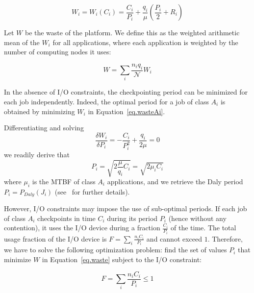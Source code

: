 \documentclass[two]{article}
\newcommand{\nbnodesplat}{{\mathcal N}}
\newcommand{\app}[1]{A_{#1}}
\newcommand{\nbapp}[1]{n_{#1}}
\newcommand{\nbnodes}[1]{q_{#1}}
\newcommand{\period}[1]{P_{#1}}
\newcommand{\ckpt}[1]{C_{#1}}
\newcommand{\reco}[1]{R_{#1}}
\newcommand{\wasteapp}[1]{W_{#1}}
\newcommand{\mtbfplat}{\mu}
\newcommand{\wasteplat}{W}
\newcommand{\ioconstraint}{F}
\newcommand{\wastefct}[2]{W_{#1}(#2)}
\begin{document}
\begin{equation}
\wasteapp{i} = \wastefct{i}{\ckpt{i}} = \frac{\ckpt{i}}{\period{i}} +
\frac{\nbnodes{i}}{\mtbfplat}(\frac{\period{i}}{2} + \reco{i})
\label{eq.wasteAi}
\end{equation}

Let $\wasteplat$ be the waste of the platform. We define this as the
weighted arithmetic mean of the $\wasteapp{i}$ for all applications,
where each application is weighted by the number of computing nodes
it uses:

\begin{equation}
\wasteplat = \sum_i \frac{\nbapp{i} \nbnodes{i}}{\nbnodesplat} \wasteapp{i}
\label{eq.waste}
\end{equation}

In the absence of I/O constraints, the checkpointing period can be minimized
for each job independently. Indeed, the optimal period for a job
of class $\app{i}$ is obtained by minimizing $\wasteapp{i}$ in 
Equation~\eqref{eq.wasteAi}.

Differentiating and solving
$$\frac{\delta \wasteapp{i}}{\delta \period{i}} = - \frac{\ckpt{i}}{\period{i}^{2}} + \frac{\nbnodes{i}}{2 \mtbfplat} = 0$$
we readily derive that
\begin{equation}
\period{i} = \sqrt{2 \frac{\mtbfplat}{\nbnodes{i}} \ckpt{i}} = \sqrt{2 \mu_{i} \ckpt{i}}
\label{eq.daly}
\end{equation}
where $\mu_{i}$ is the MTBF of  class $\app{i}$ applications, and we retrieve the Daly period
$\period{i} = \period{Daly}(J_{i})$ (see~\cite{springer-monograph} for further details).

However, I/O constraints may impose the use of sub-optimal periods. If each job
of class $\app{i}$ checkpoints in time $\ckpt{i}$ during its period $\period{i}$ (hence
without any contention), it uses the I/O device during a fraction $\frac{\ckpt{i}}{\period{i}}$ of the time.
The total usage fraction of the  I/O device is $\ioconstraint = \sum_{i} \frac{\nbapp{i} \ckpt{i}}{\period{i}}$
and cannot exceed $1$. Therefore, we have to solve the following optimization problem: find
the set of values $\period{i}$ that minimize $\wasteplat$ in Equation~\eqref{eq.waste} subject to the I/O constraint:

\begin{equation}
\ioconstraint = \sum_{i} \frac{\nbapp{i} \ckpt{i}}{\period{i}} \leq 1
\label{eq.IOconstraint}
\end{equation}
\end{document}
